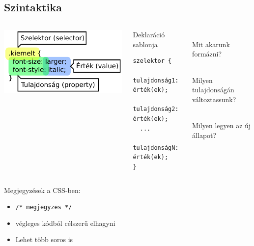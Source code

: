 \subsection{Szintaktika}

\begin{frame}[fragile]
  \begin{columns}[c]
      \includegraphics[scale=0.75]{szintakszis.pdf}\\
      \begin{block}{Deklaráció sablonja}
      \vspace{-0.5cm}
\begin{verbatim}
szelektor {
  tulajdonság1: érték(ek);
  tulajdonság2: érték(ek);
  ...
  tulajdonságN: érték(ek);
}
\end{verbatim}
      \vspace{-0.4cm}
      \end{block}
      \begin{description}[m]
        \item[Szelektor] \hfill \\ Mit akarunk formázni?
        \item[Tulajdonság] \hfill \\ Milyen tulajdonságán változtassunk?
        \item[Érték] \hfill \\ Milyen legyen az új állapot?
      \end{description}
  \end{columns}
  
\end{frame}

\begin{frame}
  Megjegyzések a CSS-ben:
  \begin{itemize}
    \item \texttt{/* megjegyzes */}
    \item végleges kódból célszerű elhagyni
    \item Lehet több soros is
  \end{itemize} 
\end{frame}

